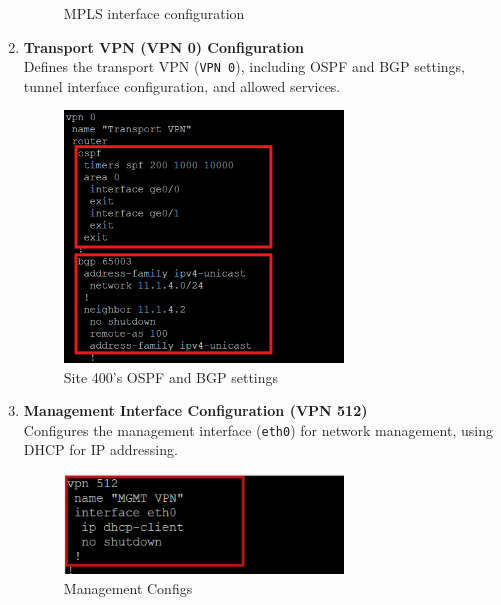 \documentclass[12pt,english]{report}
\begin{document}
\begin{enumerate}
\begin{figure}[H]
    \caption{MPLS interface configuration}
    \label{fig: MPLS interface configuration}
\end{figure}
    \item \textbf{Transport VPN (VPN 0) Configuration} \\
    Defines the transport VPN (\texttt{VPN 0}), including OSPF and BGP settings, tunnel interface configuration, and allowed services.
\begin{figure}[H]
    \centering
    \includegraphics[width= 0.7\textwidth]{chapitre 3/3vedgea2.png}
    \caption{Site 400's OSPF and BGP settings}
    \label{fig: Site 400's OSPF and BGP settings}
\end{figure}
    \item \textbf{Management Interface Configuration (VPN 512)} \\
    Configures the management interface (\texttt{eth0}) for network management, using DHCP for IP addressing.
\begin{figure}[H]
    \centering
    \includegraphics[width= 0.7\textwidth]{chapitre 3/dcvedge512.png}
    \caption{Management Configs}
    \label{fig: Management Configs}
\end{figure}
\end{enumerate}
\end{document}
